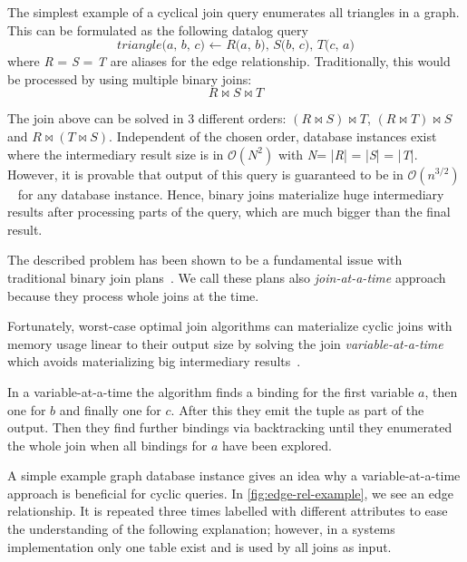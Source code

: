 The simplest example of a cyclical join query enumerates all triangles in a graph.
This can be formulated as the following datalog query
\begin{equation}
    \textit{triangle(a, b, c) $\leftarrow$ R(a, b), S(b, c), T(c, a)} \label{eqn:triangle}
\end{equation} 
 where \textit{R} = \textit{S} = \textit{T} are aliases for the edge relationship.
Traditionally, this would be processed by using multiple binary joins:
\begin{equation}
    R \bowtie S \bowtie T
\end{equation}

The join above can be solved in 3 different orders: $ (R \bowtie S) \bowtie T$, $ (R \bowtie T) \bowtie S$ and
$ R \bowtie (T \bowtie S)$.
Independent of the chosen order, database instances exist where the intermediary result size is in $\mathcal{O}(N^2)$ with
\textit{N}= |\textit{R}| = |\textit{S}| = |\textit{T}|.
However, it is provable that output of this query is guaranteed to be in $\mathcal{O}(n^{3/2})$~\cite{agm,skew-strikes-back}
for any database instance.
Hence, binary joins materialize huge intermediary results after processing parts of the query,
which are much bigger than the final result.

The described problem has been shown to be a fundamental issue with traditional binary join plans~\cite{agm,skew-strikes-back}.
We call these plans also \textit{join-at-a-time} approach because they process whole joins at the time.

Fortunately, worst-case optimal join algorithms can materialize cyclic joins with memory usage linear to their output size
by solving the join \textit{variable-at-a-time} which avoids materializing big intermediary results~\cite{leapfrog,nprr}.

In a variable-at-a-time the algorithm finds a binding for the first variable $a$, then one for $b$ and
finally one for $c$.
After this they emit the tuple as part of the output.
Then they find further bindings via backtracking until they enumerated the whole join when all bindings for $a$ have been explored.

A simple example graph database instance gives an idea why a variable-at-a-time approach is beneficial for cyclic queries.
In \cref{fig:edge-rel-example}, we see an edge relationship.
It is repeated three times labelled with different attributes to ease the understanding of the following explanation;
however, in a systems implementation only one table exist and is used by all joins as input.

